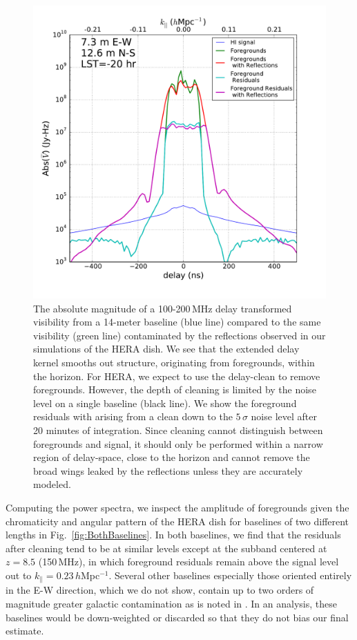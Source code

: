 \documentclass[twocolumn]{emulateapj}
\begin{document}
\begin{figure}
\includegraphics[width=.5\textwidth]{figures/cleaning_noise_Nithya.pdf}
\caption{The absolute magnitude of a  100-200\,MHz delay transformed visibility from a 14-meter baseline (blue line) compared to the same visibility (green line) contaminated by the reflections observed in our simulations of the HERA dish. We see that the extended delay kernel smooths out structure, originating from foregrounds, within the horizon. For HERA, we expect to use the delay-clean to remove foregrounds. However, the depth of cleaning is limited by the noise level on a single baseline (black line). We show the foreground residuals with arising from a clean down to the $5\,\sigma$ noise level after 20 minutes of integration. Since cleaning cannot distinguish between foregrounds and signal, it should only be performed within a narrow region of delay-space, close to the horizon and cannot remove the broad wings leaked by the reflections unless they are accurately modeled.}
\label{fig:Cleaning}
\end{figure}


Computing the power spectra, we inspect the amplitude of foregrounds given the chromaticity and angular pattern of the HERA dish for baselines of two different lengths in Fig.~\ref{fig:BothBaselines}. In both baselines, we find that the residuals after cleaning tend to be at similar levels except at the subband centered at $z=8.5$ (150\,MHz), in which foreground residuals remain above the signal level out to $k_\parallel=0.23$\,$h$Mpc$^{-1}$. Several other baselines especially those oriented entirely in the E-W direction, which we do not show, contain up to two orders of magnitude greater galactic  contamination as is noted in \citet{Thyagarajan:2015b}. In an analysis, these baselines would be down-weighted or discarded so that they do not bias our final estimate. 
\end{document}
